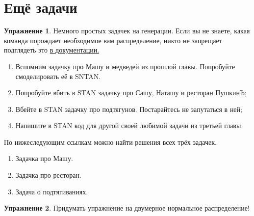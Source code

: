 \documentclass[12pt, a4paper, oneside]{extreport}
\theoremstyle{plain}              %
\theoremstyle{definition}         %
\newtheorem{problem}{\color{myblue} Упражнение}
\begin{document}
\section{Ещё задачи}

\begin{problem}
	Немного простых задачек на генерации. Если вы не знаете, какая команда порождает необходимое вам распределение, никто не запрещает подглядеть это \href{https://github.com/stan-dev/stan/releases/download/v2.16.0/stan-reference-2.16.0.pdf}{в документации.} 
	\begin{enumerate}
		\item  Вспомним задачку про Машу и медведей из прошлой главы.  Попробуйте смоделировать её в SNTAN. 
		\item  Попробуйте вбить в STAN задачку про Сашу, Наташу и ресторан ПушкинЪ;
		\item  Вбейте в STAN задачку про подтягунов. Постарайтесь не запутаться в ней; 
		\item  Напишите в STAN код для другой своей любимой задачи из третьей главы. 
	\end{enumerate}

    \begin{sol}
	 По нижеследующим ссылкам можно найти решения всех трёх задачек. 
	 	\begin{enumerate}
	 	\item  Задачка про Машу. 
	 	\item  Задачка про ресторан. 
	 	\item  Задача о подтягиваниях. 
	 \end{enumerate}	
	\end{sol}
\end{problem}


\begin{problem}
	Придумать упражнение на двумерное нормальное распределение! 
	\begin{sol}
		
	\end{sol}
\end{problem}
\end{document}
